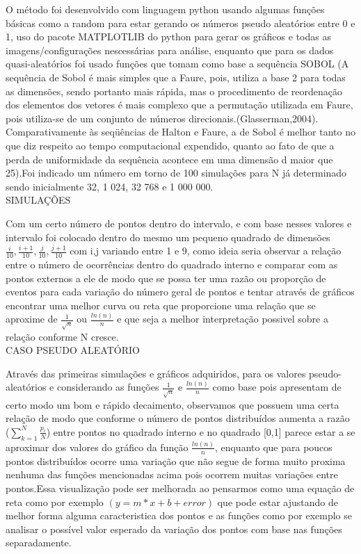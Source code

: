 \documentclass[a4paper, 12pt]{article}
\begin{document}
  O método foi desenvolvido com linguagem python usando algumas funções básicas como a random para estar gerando os números pseudo aleatórios entre 0 e 1, uso do pacote MATPLOTLIB do python para gerar os gráficos e todas as imagens/configurações nescessárias para análise, enquanto que para os dados quasi-aleatórios foi usado funções que tomam como base a sequência SOBOL (A sequência de Sobol é mais simples que a Faure, pois, utiliza a base 2 para todas as dimensões, sendo portanto mais rápida, mas o procedimento de reordenação dos elementos dos vetores é mais complexo que a permutação utilizada em Faure, pois utiliza-se de um conjunto de números direcionais.(Glasserman,2004).
  Comparativamente às seqüências de Halton e Faure, a de Sobol é melhor tanto no que diz respeito ao tempo computacional expendido, quanto ao fato de que a perda de uniformidade da sequência acontece em uma dimensão d maior que 25).Foi indicado um número em torno de   100 simulações para N já determinado sendo inicialmente 32, 1 024, 32 768 e 1 000 000.\\
 
\textsc{SIMULAÇÕES }
\newline

 Com um certo número de pontos dentro do intervalo, e com base nesses valores e intervalo foi colocado dentro do mesmo um pequeno quadrado de dimensões $\frac{i}{10}, \frac{i+1}{10}, \frac{j}{10}, \frac{j+1}{10}$ com i,j variando entre 1 e 9, como ideia seria observar a relação entre o número de ocorrências dentro do quadrado interno e comparar com as pontos externos a ele de modo que se possa ter uma razão ou proporção de eventos para cada variação do número geral de pontos e tentar através de gráficos encontrar uma melhor curva ou reta que proporcione uma relação que se aproxime de $\frac{1}{\sqrt{n}}$ ou $\frac{ln(n)}{n}$  e que seja a melhor interpretação possivel sobre a relação conforme N cresce.\\
 
\textsc{CASO PSEUDO ALEATÓRIO}
\newline
  
 Através das primeiras simulações e gráficos adquiridos, para os valores pseudo-aleatórios e considerando as funções $\frac{1}{\sqrt{n}}$ e $\frac{ln(n)}{n}$ como base pois apresentam de certo modo um bom e rápido decaimento, observamos que possuem uma certa relação de modo que conforme o número de pontos distribuídos aumenta a razão ($\sum_{k=1}^{N}\frac{p_i}{N}$) entre pontos no quadrado interno e no quadrado [0,1] parece estar a se aproximar dos valores do gráfico da função $\frac{ln(n)}{n}$, enquanto que para poucos pontos distribuídos ocorre uma variação que não segue de forma muito proxima nenhuma das funções mencionadas acima pois ocorrem muitas variações entre pontos.Essa visualização pode ser melhorada ao pensarmos como uma equação de reta como por exemplo $(y = m * x + b + error)$ que pode estar ajustando de melhor forma alguma caracteristica dos pontos e as funções como por exemplo se analisar o possível valor esperado da variação dos pontos com base nas funções separadamente.
 
\end{document}
